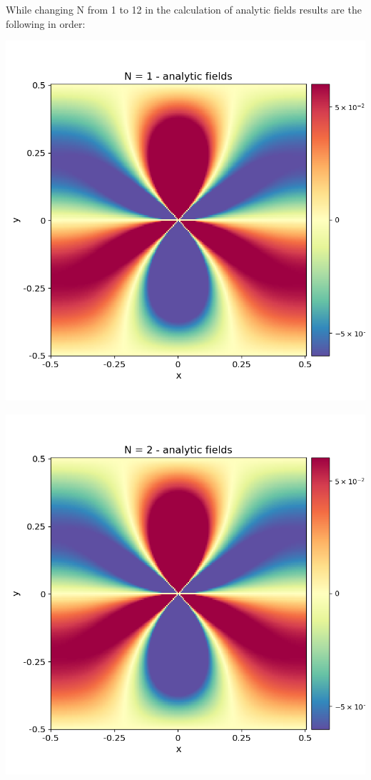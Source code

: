 \documentclass[12pt,a4paper]{article}
\theoremstyle{plain}
\begin{document}
\begin{multicols*}{2}
	\par While changing N from 1 to 12 in the calculation of analytic fields results are the
	following in order:

	\vspace{1cm}

	\begin{minipage}{0.22\columnwidth}
		\centering
		\includegraphics[width=\columnwidth]{./stress_field_01.png}
	\end{minipage}
	\begin{minipage}{0.22\columnwidth}
		\centering
		\includegraphics[width=\columnwidth]{./stress_field_02.png}

\end{minipage}
\end{multicols*}
\end{document}
